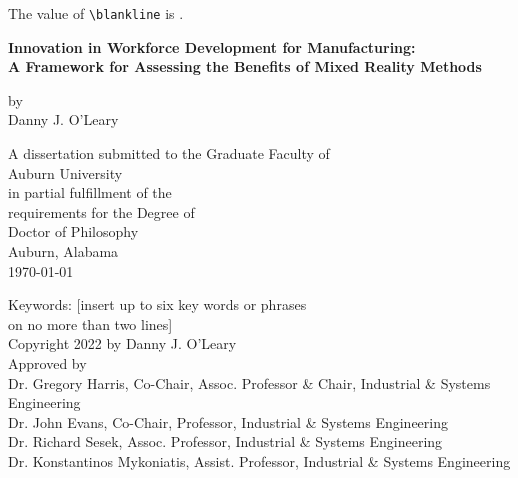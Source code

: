 \documentclass[
    fontsize=11,
    paper=letter,
    twoside=true,  %
    open=right,
    chapterprefix=true,  %
    appendixprefix=true,  %
    numbers=noendperiod,  %
    toc=flat,  %
    usegeometry=true  %
  ]{scrreprt}
\newlength{\blankline}
\begin{document}
The value of \verb|\blankline| is \texttt{\the\blankline}.


\pagestyle{plain}  %

\begin{titlepage}
\begin{singlespace}
\centering
\rule{0pt}{1in} %

\textbf{%
Innovation in Workforce Development for Manufacturing:\\
A Framework for Assessing the Benefits of Mixed Reality Methods
} %
\vspace{\baselineskip}

by\\ [\baselineskip]
Danny J. O'Leary
\vspace{4\baselineskip}

A dissertation submitted to the Graduate Faculty of\\
Auburn University\\
in partial fulfillment of the\\
requirements for the Degree of\\
Doctor of Philosophy\\ [\baselineskip]
Auburn, Alabama\\
\today %

\vspace{4\baselineskip}
Keywords: [insert up to six key words or phrases\\
on no more than two lines]\\ [2\baselineskip]
Copyright 2022 by Danny J. O'Leary\\ [2\baselineskip]
Approved by\\ [\baselineskip]
Dr. Gregory Harris, Co-Chair, Assoc. Professor \& Chair, Industrial \& Systems Engineering\\
Dr. John Evans, Co-Chair, Professor, Industrial \& Systems Engineering\\
Dr. Richard Sesek, Assoc. Professor, Industrial \& Systems Engineering\\
Dr. Konstantinos Mykoniatis, Assist. Professor, Industrial \& Systems Engineering
\end{singlespace}
\end{titlepage}
\end{document}
